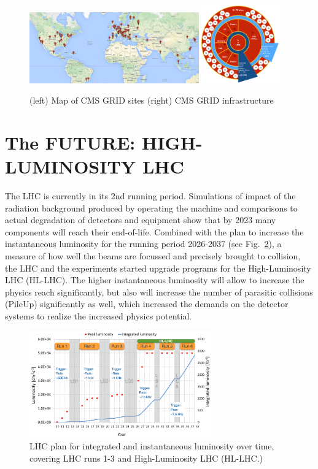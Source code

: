 \documentclass{wscpaperproc}
\theoremstyle{wsc}
\begin{document}
\begin{figure}[htb]
{
   \centering
   \includegraphics[width=0.65\textwidth]{grid}
   \includegraphics[width=0.3\textwidth]{grid2}
   \caption{(left) Map of CMS GRID sites (right) CMS GRID infrastructure
   \label{fig:grid}}
}
\end{figure}

\section{The FUTURE: HIGH-LUMINOSITY LHC}
\label{sec:hl-lhc}

The LHC is currently in its 2nd running period. Simulations of impact of the radiation background produced by operating the machine and comparisons to actual degradation of detectors and equipment show that by 2023 many components will reach their end-of-life. Combined with the plan to increase the instantaneous luminosity for the running period 2026-2037 (see Fig.~\ref{fig:hllhc}), a measure of how well the beams are focussed and precisely brought to collision, the LHC and the experiments started upgrade programs for the High-Luminosity LHC (HL-LHC). The higher instantaneous luminosity will allow to increase the physics reach significantly, but also will increase the number of parasitic collisions (PileUp) significantly as well, which increased the demands on the detector systems to realize the increased physics potential. 

\begin{figure}[htb]
{
   \centering
   \includegraphics[width=0.70\textwidth]{hllhc}
   \caption{LHC plan for integrated and instantaneous luminosity over time, covering LHC runs 1-3 and High-Luminosity LHC (HL-LHC.)
   \label{fig:hllhc}}
}
\end{figure}
\end{document}
